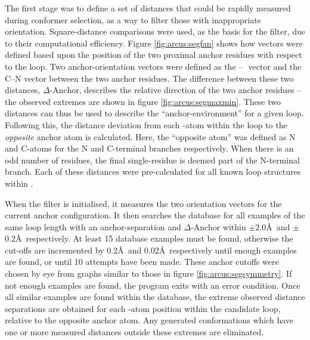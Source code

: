 The first stage was to define a set of distances that could be rapidly measured during conformer selection, as a way to filter those with inappropriate orientation. Square-distance comparisons were used, as the basis for the filter, due to their computational efficiency. Figure \ref{fig:arcus:segfan} shows how vectors were defined based upon the position of the two proximal anchor residues with respect to the loop. Two anchor-orientation vectors were defined as  the \ca--\,\ca\ vector and the C--N vector between the two anchor residues. The difference between these two distances, $\Delta$-Anchor, describes the relative direction of the two anchor residues -- the observed extremes are shown in  figure \ref{fig:arcus:segmaxmin}. These two distances can thus be used to describe the ``anchor-environment'' for a given loop. Following this, the distance deviation from each \ca-atom within the loop to the \emph{opposite} anchor atom is calculated. Here, the ``opposite atom'' was defined as N and C-atoms for the N and C-terminal branches respectively. When there is an odd number of residues, the final single-residue is deemed part of the N-terminal branch. Each of these distances were pre-calculated for all known loop structures within \thothloopdb. 

When the filter is initialised, it measures the two orientation vectors for the current anchor configuration. It then searches the database for all examples of the same loop length with an anchor-separation and $\Delta$-Anchor within $\pm2.0$\AA\ and $\pm$0.2\AA\ respectively. At least 15 database examples must be found, otherwise the cut-offs are incremented by 0.2\AA\ and 0.02\AA\ respectively until enough examples are found, or until 10 attempts have been made. These anchor cutoffs were chosen by eye from graphs similar to those in figure \ref{fig:arcus:segsymmetry}.
If not enough examples are found, the program exits with an error condition.
Once all similar examples are found within the database, the extreme observed distance separations are obtained for each \ca-atom position within the candidate loop, relative to the opposite anchor atom.  Any generated conformations which have one or more measured distances outside these extremes are eliminated.

